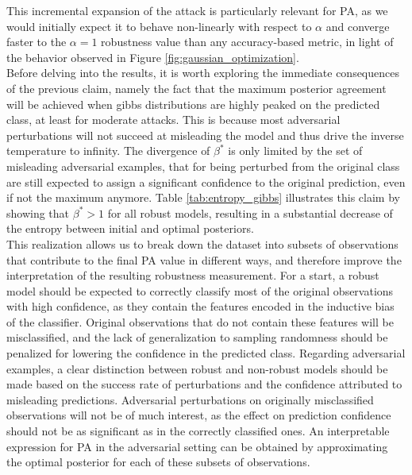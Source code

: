 This incremental expansion of the attack is particularly relevant for PA, as we would initially 
expect it to behave non-linearly with respect to $\alpha$ and converge faster to
the $\alpha=1$ robustness value than any accuracy-based metric, in light of the behavior observed
in Figure \ref{fig:gaussian_optimization}. \\

Before delving into the results, it is worth exploring the immediate consequences
of the previous claim, namely the fact that the maximum posterior agreement will
be achieved when gibbs distributions are highly peaked on the predicted 
class, at least for moderate attacks. This is because most adversarial 
perturbations will not succeed at misleading the model and thus drive the inverse temperature to
infinity. The divergence of $\beta^{*}$ is only limited by the set of misleading adversarial 
examples, that for being perturbed from the original class are still expected to assign a
significant confidence to the original prediction, even if not the maximum anymore.
Table \ref{tab:entropy_gibbs} illustrates this claim by showing that $\beta^{*} > 1$ 
for all robust models, resulting in a substantial decrease of the entropy between initial and 
optimal posteriors. \\

This realization allows us to break down the dataset into subsets of observations
that contribute to the final PA value in different ways, and therefore improve
the interpretation of the resulting robustness measurement.
For a start, a robust model should be expected to correctly classify most of the 
original observations with high confidence, as they
contain the features encoded in the inductive bias of the 
classifier. Original observations that do not contain these features will be misclassified,
and the lack of generalization to sampling randomness should be penalized for lowering
the confidence in the predicted class. Regarding adversarial examples, a clear
distinction between robust and non-robust models should be made based on the success 
rate of perturbations and the confidence attributed to misleading predictions. Adversarial 
perturbations on originally misclassified observations will not be of much interest,
as the effect on prediction confidence should not be as significant as in
the correctly classified ones. An interpretable expression for PA in the adversarial
setting can be obtained by approximating the optimal posterior for each of these
subsets of observations. \\

